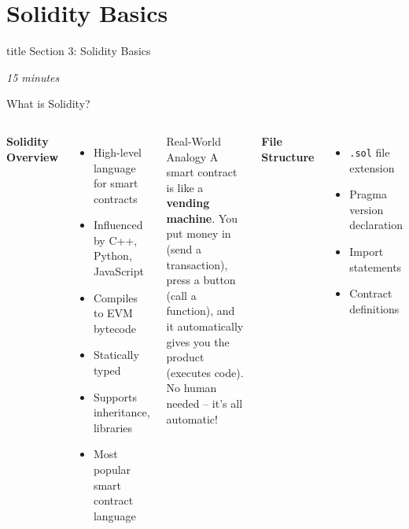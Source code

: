 \documentclass[8pt,aspectratio=169]{beamer}
\begin{document}
\section{Solidity Basics}

\begin{frame}[t]
\vfill
\centering
\begin{beamercolorbox}[sep=8pt,center]{title}
\Large Section 3: Solidity Basics\par
\end{beamercolorbox}
\vfill
\small \textit{15 minutes}
\end{frame}

\begin{frame}[t,fragile]{What is Solidity?}
\begin{columns}[T]
\textbf{Solidity Overview}

\begin{itemize}
\item High-level language for smart contracts
\item Influenced by C++, Python, JavaScript
\item Compiles to EVM bytecode
\item Statically typed
\item Supports inheritance, libraries
\item Most popular smart contract language
\end{itemize}

\vspace{0.3em}
\begin{block}{Real-World Analogy}
A smart contract is like a \textbf{vending machine}. You put money in (send a transaction), press a button (call a function), and it automatically gives you the product (executes code). No human needed -- it's all automatic!
\end{block}

\vspace{0.3em}
\textbf{File Structure}
\begin{itemize}
\item \texttt{.sol} file extension
\item Pragma version declaration
\item Import statements
\item Contract definitions
\end{itemize}


\end{columns}
\end{frame}
\end{document}
